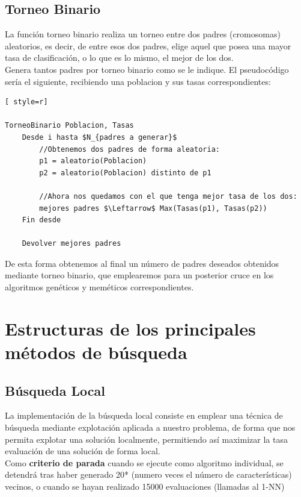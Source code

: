 \subsection{Torneo Binario}
La función torneo binario realiza un torneo entre dos padres (cromosomas) aleatorios, es decir, de entre esos dos padres, elige aquel que posea una mayor tasa de clasificación, o lo que es lo mismo, el mejor de los dos.\\ 
Genera tantos padres por torneo binario como se le indique. El pseudocódigo sería el siguiente, recibiendo una poblacion y sus tasas correspondientes:

\begin{lstlisting}[ style=r]

TorneoBinario Poblacion, Tasas
	Desde i hasta $N_{padres a generar}$
		//Obtenemos dos padres de forma aleatoria:
		p1 = aleatorio(Poblacion)
		p2 = aleatorio(Poblacion) distinto de p1
		
		//Ahora nos quedamos con el que tenga mejor tasa de los dos:
		mejores padres $\Leftarrow$ Max(Tasas(p1), Tasas(p2))
	Fin desde
	
	Devolver mejores padres

\end{lstlisting}

De esta forma obtenemos al final un número de padres deseados obtenidos mediante torneo binario, que emplearemos para un posterior cruce en los algoritmos genéticos y meméticos correspondientes.


\section{Estructuras de los principales métodos de búsqueda}

\subsection{Búsqueda Local}
La implementación de la búsqueda local consiste en emplear una técnica de búsqueda mediante explotación aplicada a nuestro problema, de forma que nos permita explotar una solución localmente, permitiendo así maximizar la tasa evaluación de una solución de forma local.\\ 

Como \textbf{criterio de parada} cuando se ejecute como algoritmo individual, se detendrá tras haber generado 20* (numero veces el número de características) vecinos, o cuando se hayan realizado 15000 evaluaciones (llamadas al 1-NN)

